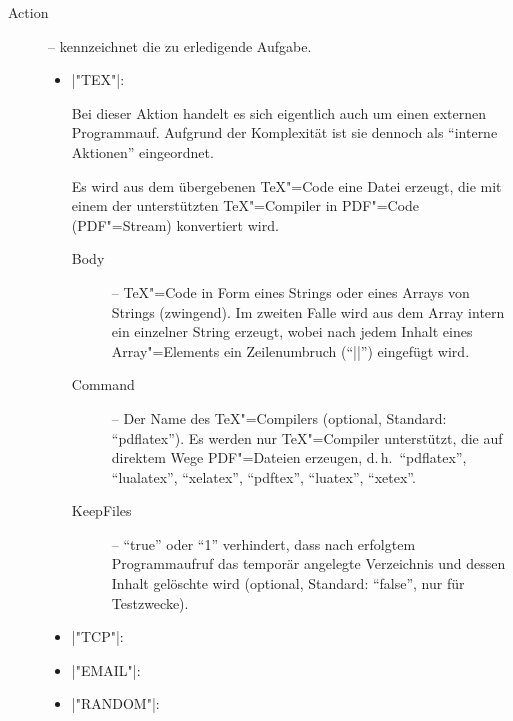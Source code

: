 \documentclass[%
fontsize=11pt
,paper=a4
,twoside
,headings=normal
,pagesize
]{scrartcl}
\begin{document}
 \begin{description}

  \item[Action] -- kennzeichnet die zu erledigende Aufgabe.

  \begin{itemize}

    \item |"TEX"|: \par

      Bei dieser Aktion handelt es sich eigentlich auch um einen externen
      Programmauf. Aufgrund der Komplexität ist sie dennoch als "`interne
      Aktionen"' eingeordnet.

      Es wird aus dem übergebenen \TeX"=Code eine Datei erzeugt, die mit
      einem der unterstützten \TeX"=Compiler in PDF"=Code (PDF"=Stream)
      konvertiert wird.

      \begin{description}

        \item[Body] -- \TeX"=Code in Form eines Strings oder eines Arrays von
        Strings (zwingend). Im zweiten Falle wird aus dem Array intern ein
        einzelner String erzeugt, wobei nach jedem Inhalt eines
        Array"=Elements ein Zeilenumbruch ("`|\n|"') eingefügt wird.

        \item[Command] -- Der Name des \TeX"=Compilers (optional, Standard:
        "`pdflatex"'). Es werden nur \TeX"=Compiler unterstützt, die auf
        direktem Wege PDF"=Dateien erzeugen, d.\,h.\ "`pdflatex"',
        "`lualatex"', "`xelatex"', "`pdftex"', "`luatex"', "`xetex"'.

        \item[KeepFiles] -- "`true"' oder "`1"' verhindert, dass nach
        erfolgtem Programmaufruf das temporär angelegte Verzeichnis und
        dessen Inhalt gelöschte wird (optional, Standard: "`false"', nur für
        Testzwecke).

      \end{description}

    \item |"TCP"|: \par

    \item |"EMAIL"|: \par

    \item |"RANDOM"|: \par


\end{itemize}
\end{description}
\end{document}
